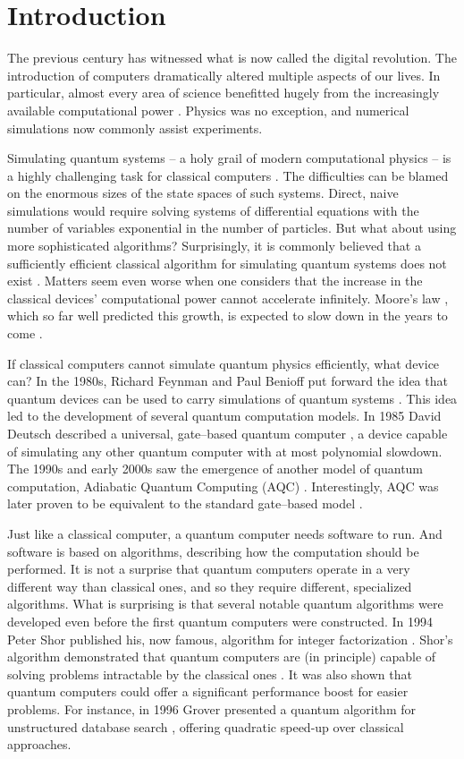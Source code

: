 \chapter{Introduction}
The previous century has witnessed what is now called the digital revolution. The introduction of
computers dramatically altered multiple aspects of our lives. In particular, almost every area of
science benefitted hugely from the increasingly available computational power \cite{winsberg}.
Physics was no exception, and numerical simulations now commonly assist experiments.

Simulating quantum systems -- a holy grail of modern computational physics -- is a highly
challenging task for classical computers \cite{feynman.82}. The difficulties can be blamed on the
enormous sizes of the state spaces of such systems. Direct, naive simulations would require solving
systems of differential equations with the number of variables exponential in the number of
particles. But what about using more sophisticated algorithms? Surprisingly, it is commonly believed
that a sufficiently efficient classical algorithm for simulating quantum systems does not exist
\cite{feynman.82, poplavskii}. Matters seem even worse when one considers that the increase in the
classical devices' computational power cannot accelerate infinitely. Moore's law \cite{mack}, which
so far well predicted this growth, is expected to slow down in the years to come \cite{waldrop,
kumar}.

If classical computers cannot simulate quantum physics efficiently, what device can? In the 1980s,
Richard Feynman and Paul Benioff put forward the idea that quantum devices can be used to carry
simulations of quantum systems \cite{feynman.82,benioff.80}. This idea led to the development of
several quantum computation models. In 1985 David Deutsch described a universal, gate--based quantum
computer \cite{deutsch}, a device capable of simulating any other quantum computer with at most
polynomial slowdown. The 1990s and early 2000s saw the emergence of another model of quantum
computation, Adiabatic Quantum Computing (AQC) \cite{kadowaki,farhi}. Interestingly, AQC was later
proven to be equivalent to the standard gate--based model \cite{aharonov}.

Just like a classical computer, a quantum computer needs software to run. And software is based on
algorithms, describing how the computation should be performed. It is not a surprise that quantum
computers operate in a very different way than classical ones, and so they require different,
specialized algorithms. What is surprising is that several notable quantum algorithms were developed
even before the first quantum computers were constructed. In 1994 Peter Shor published his, now
famous, algorithm for integer factorization \cite{shor}. Shor's algorithm demonstrated that quantum
computers are (in principle) capable of solving problems intractable by the classical ones
\cite{kleinjung}. It was also shown that quantum computers could offer a significant performance
boost for easier problems. For instance, in 1996 Grover presented a quantum algorithm for
unstructured database search \cite{grover}, offering quadratic speed-up over classical approaches. 

